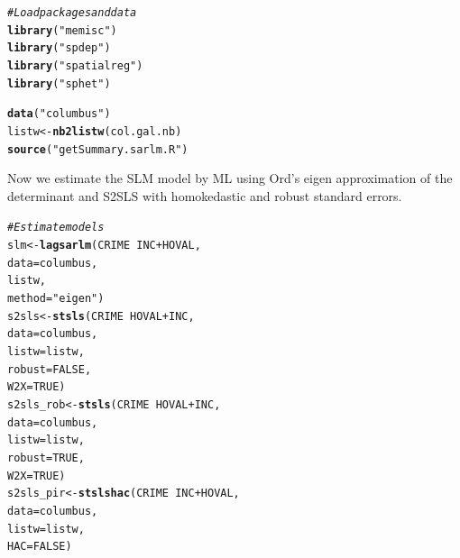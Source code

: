 \documentclass[english,12pt]{book}\usepackage[]{graphicx}\usepackage[]{xcolor}
\makeatletter
\newcommand{\hlnum}[1]{\textcolor[rgb]{0.686,0.059,0.569}{#1}}%
\newcommand{\hlstr}[1]{\textcolor[rgb]{0.192,0.494,0.8}{#1}}%
\newcommand{\hlcom}[1]{\textcolor[rgb]{0.678,0.584,0.686}{\textit{#1}}}%
\newcommand{\hlopt}[1]{\textcolor[rgb]{0,0,0}{#1}}%
\newcommand{\hlstd}[1]{\textcolor[rgb]{0.345,0.345,0.345}{#1}}%
\newcommand{\hlkwb}[1]{\textcolor[rgb]{0.69,0.353,0.396}{#1}}%
\newcommand{\hlkwc}[1]{\textcolor[rgb]{0.333,0.667,0.333}{#1}}%
\newcommand{\hlkwd}[1]{\textcolor[rgb]{0.737,0.353,0.396}{\textbf{#1}}}%
\newenvironment{kframe}{%
 \def\at@end@of@kframe{}%
 \ifinner\ifhmode%
  \def\at@end@of@kframe{\end{minipage}}%
  \begin{minipage}{\columnwidth}%
 \fi\fi%
 \def\FrameCommand##1{\hskip\@totalleftmargin \hskip-\fboxsep
 \colorbox{shadecolor}{##1}\hskip-\fboxsep
     \hskip-\linewidth \hskip-\@totalleftmargin \hskip\columnwidth}%
 \MakeFramed {\advance\hsize-\width
   \@totalleftmargin\z@ \linewidth\hsize
   \@setminipage}}%
 {\par\unskip\endMakeFramed%
 \at@end@of@kframe}
\newenvironment{knitrout}{}{} %
\makeatother
\begin{document}
\begin{knitrout}
\color{fgcolor}\begin{kframe}
\begin{alltt}
\hlcom{# Load packages and data}
\hlkwd{library}\hlstd{(}\hlstr{"memisc"}\hlstd{)}
\hlkwd{library}\hlstd{(}\hlstr{"spdep"}\hlstd{)}
\hlkwd{library}\hlstd{(}\hlstr{"spatialreg"}\hlstd{)}
\hlkwd{library}\hlstd{(}\hlstr{"sphet"}\hlstd{)}
\end{alltt}


{\ttfamily\noindent\itshape\color{messagecolor}{\#\# \\\#\# Attaching package: 'sphet'}}

{\ttfamily\noindent\itshape\color{messagecolor}{\#\# The following object is masked from 'package:spatialreg':\\\#\# \\\#\# \ \ \ \ impacts}}\begin{alltt}
\hlkwd{data}\hlstd{(}\hlstr{"columbus"}\hlstd{)}
\hlstd{listw} \hlkwb{<-} \hlkwd{nb2listw}\hlstd{(col.gal.nb)}
\hlkwd{source}\hlstd{(}\hlstr{"getSummary.sarlm.R"}\hlstd{)}
\end{alltt}
\end{kframe}
\end{knitrout}

Now we estimate the SLM model by ML using Ord's eigen approximation of the determinant and S2SLS with homokedastic and robust standard errors. 

\begin{knitrout}
\color{fgcolor}\begin{kframe}
\begin{alltt}
\hlcom{# Estimate models}
\hlstd{slm}      \hlkwb{<-} \hlkwd{lagsarlm}\hlstd{(CRIME} \hlopt{~} \hlstd{INC} \hlopt{+} \hlstd{HOVAL,}
                     \hlkwc{data} \hlstd{= columbus,}
                     \hlstd{listw,}
                     \hlkwc{method} \hlstd{=} \hlstr{"eigen"}\hlstd{)}
\hlstd{s2sls}    \hlkwb{<-} \hlkwd{stsls}\hlstd{(CRIME} \hlopt{~} \hlstd{HOVAL} \hlopt{+} \hlstd{INC,}
                  \hlkwc{data} \hlstd{=  columbus,}
                  \hlkwc{listw} \hlstd{= listw,}
                  \hlkwc{robust} \hlstd{=} \hlnum{FALSE}\hlstd{,}
                  \hlkwc{W2X} \hlstd{=} \hlnum{TRUE}\hlstd{)}
\hlstd{s2sls_rob} \hlkwb{<-} \hlkwd{stsls}\hlstd{(CRIME} \hlopt{~} \hlstd{HOVAL} \hlopt{+} \hlstd{INC,}
                   \hlkwc{data} \hlstd{=  columbus,}
                   \hlkwc{listw} \hlstd{= listw,}
                   \hlkwc{robust} \hlstd{=} \hlnum{TRUE}\hlstd{,}
                   \hlkwc{W2X} \hlstd{=} \hlnum{TRUE}\hlstd{)}
\hlstd{s2sls_pir} \hlkwb{<-} \hlkwd{stslshac}\hlstd{(CRIME} \hlopt{~} \hlstd{INC} \hlopt{+} \hlstd{HOVAL,}
                      \hlkwc{data} \hlstd{= columbus,}
                      \hlkwc{listw} \hlstd{= listw,}
                      \hlkwc{HAC} \hlstd{=} \hlnum{FALSE}\hlstd{)}
\end{alltt}
\end{kframe}
\end{knitrout}
\end{document}
